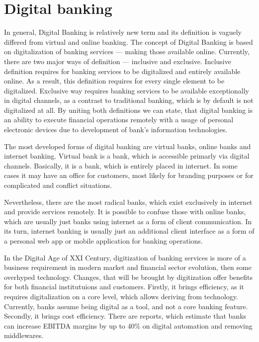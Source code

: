 
\section{Digital banking}

In general, Digital Banking is relatively new term and its definition is vaguely differed from virtual and online banking.
The concept of Digital Banking is based on digitalization of banking services — making those available online.
Currently, there are two major ways of definition — inclusive and exclusive.
Inclusive definition requires for banking services to be digitalized and entirely available online.
As a result, this definition requires for every single element to be digitalized.
Exclusive way requires banking services to be available exceptionally in digital channels, as a contrast to traditional banking, which is by default is not digitalized at all.
By uniting both definitions we can state, that digital banking is an ability to execute financial operations remotely with a usage of personal electronic devices due to development of bank's information technologies.
\cite{digital_banking_2020}

The most developed forms of digital banking are virtual banks, online banks and internet banking.
Virtual bank is a bank, which is accessible primarly via digital channels. 
Basically, it is a bank, which is entirely placed in internet.
In some cases it may have an office for customers, most likely for branding purposes or for complicated and conflict situations.

Nevertheless, there are the most radical banks, which exist exclusively in internet and provide services remotely.
It is possible to confuse those with online banks, which are usually just banks using internet as a form of client communication.
In its turn, internet banking is usually just an additional client interface as a form of a personal web app or mobile application for banking operations.

In the Digital Age of XXI Century, digitization of banking services is more of a business requirement in modern market and financial sector evolution, then some overhyped technology.
Changes, that will be brought by digitization offer benefits for both financial institutuions and customers.
Firstly, it brings efficiency, as it requires digitalization on a core level, which allows deriving from technology. 
Currently, banks assume being digital as a tool, and not a core banking feature.
Secondly, it brings cost efficiency. There are reports, which estimate that banks can increase EBITDA margins by up to 40\% on digital automation and removing middlewares.
\cite{rise_digital_bank_mckinsey}

